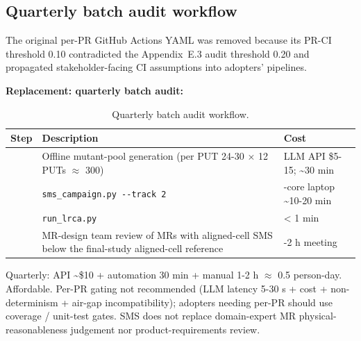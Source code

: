 \documentclass[manuscript,screen,review]{acmart}
\begin{document}
\subsection{Quarterly batch audit workflow}\label{e.2-quarterly-batch-audit-workflow}

The original per-PR GitHub Actions YAML was removed because its PR-CI
threshold 0.10 contradicted the Appendix~E.3 audit threshold 0.20 and propagated
stakeholder-facing CI assumptions into adopters' pipelines.

\textbf{Replacement: quarterly batch audit:}

{%
\begin{longtable}[]{@{}
  >{\raggedright\arraybackslash}p{}
  >{\raggedright\arraybackslash}p{}
  >{\raggedright\arraybackslash}p{}@{}}
\caption{Quarterly batch audit workflow.}\label{tab:p2-26}\\
\toprule\noalign{}
\begin{minipage}[b]{\linewidth}\raggedright
Step
\end{minipage} & \begin{minipage}[b]{\linewidth}\raggedright
Description
\end{minipage} & \begin{minipage}[b]{\linewidth}\raggedright
Cost
\end{minipage} \\
\midrule\noalign{}
\endfirsthead
\endhead
\bottomrule\noalign{}
\endlastfoot
1 & Offline mutant-pool generation (per PUT 24-30 $\times$ 12 PUTs $\approx$ 300) & LLM
API \$5-15; \textasciitilde30 min \\
2 & \texttt{sms\_campaign.py\ -\/-track\ 2} & 4-core laptop
\textasciitilde10-20 min \\
3 & \texttt{run\_lrca.py} & \textless{} 1 min \\
4 & MR-design team review of MRs with aligned-cell SMS below the
final-study aligned-cell reference & 1-2 h meeting \\
\end{longtable}
}

Quarterly: API \textasciitilde\$10 + automation 30 min + manual 1-2 h $\approx$
0.5 person-day. Affordable. Per-PR gating not recommended (LLM latency
5-30 s + cost + non-determinism + air-gap incompatibility); adopters
needing per-PR should use coverage / unit-test gates. SMS does not
replace domain-expert MR physical-reasonableness judgement nor
product-requirements review.
\end{document}
